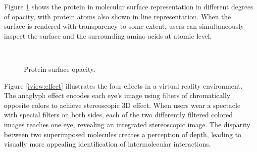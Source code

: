 Figure \ref{iview:opacity} shows the protein in molecular surface representation in different degrees of opacity, with protein atoms also shown in line representation. When the surface is rendered with transparency to some extent, users can simultaneously inspect the surface and the surrounding amino acids at atomic level.

\begin{figure}
\centering
{}
\\
\caption{Protein surface opacity.}
\label{iview:opacity}
\end{figure}

Figure \ref{iview:effect} illustrates the four effects in a virtual reality environment. The anaglyph effect encodes each eye's image using filters of chromatically opposite colors to achieve stereoscopic 3D effect. When users wear a spectacle with special filters on both sides, each of the two differently filtered colored images reaches one eye, revealing an integrated stereoscopic image. The disparity between two superimposed molecules creates a perception of depth, leading to visually more appealing identification of intermolecular interactions.

